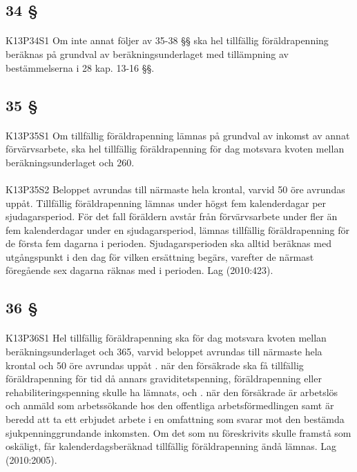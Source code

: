 \documentclass[a4paper,notitlepage,openany,10pt]{book}
\begin{document}
\subsection*{34 §}
\paragraph*{}
{\tiny K13P34S1}
Om inte annat följer av 35-38 §§ ska hel tillfällig föräldrapenning beräknas på grundval av beräkningsunderlaget med tillämpning av bestämmelserna i 28 kap. 13-16 §§.
\subsection*{35 §}
\paragraph*{}
{\tiny K13P35S1}
Om tillfällig föräldrapenning lämnas på grundval av inkomst av annat förvärvsarbete, ska hel tillfällig föräldrapenning för dag motsvara kvoten mellan beräkningsunderlaget och 260.
\paragraph*{}
{\tiny K13P35S2}
Beloppet avrundas till närmaste hela krontal, varvid 50 öre avrundas uppåt. Tillfällig föräldrapenning lämnas under högst fem kalenderdagar per sjudagarsperiod. För det fall föräldern avstår från förvärvsarbete under fler än fem kalenderdagar under en sjudagarsperiod, lämnas tillfällig föräldrapenning för de första fem dagarna i perioden. Sjudagarsperioden ska alltid beräknas med utgångspunkt i den dag för vilken ersättning begärs, varefter de närmast föregående sex dagarna räknas med i perioden.
Lag (2010:423).
\subsection*{36 §}
\paragraph*{}
{\tiny K13P36S1}
Hel tillfällig föräldrapenning ska för dag motsvara kvoten mellan beräkningsunderlaget och 365, varvid beloppet avrundas till närmaste hela krontal och 50 öre avrundas uppåt
. när den försäkrade ska få tillfällig föräldrapenning för tid då annars graviditetspenning, föräldrapenning eller rehabiliteringspenning skulle ha lämnats, och
. när den försäkrade är arbetslös och anmäld som arbetssökande hos den offentliga arbetsförmedlingen samt är beredd att ta ett erbjudet arbete i en omfattning som svarar mot den bestämda sjukpenninggrundande inkomsten. Om det som nu föreskrivits skulle framstå som oskäligt, får kalenderdagsberäknad tillfällig föräldrapenning ändå lämnas.
Lag (2010:2005).
\end{document}
